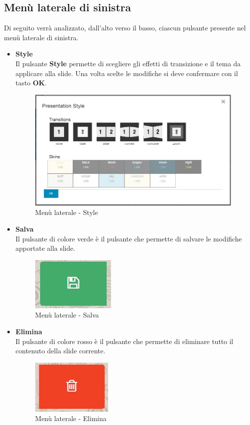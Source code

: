 \subsection{Menù laterale di sinistra}
Di seguito verrà analizzato, dall'alto verso il basso, ciascun pulsante presente nel menù laterale di sinistra.

\begin{itemize}
 \item \textbf{Style}\\
    Il pulsante \textbf{Style} permette di scegliere gli effetti di transizione e il tema da applicare alla slide. Una volta scelte le modifiche si deve confermare con il tasto \textbf{OK}.	
    \begin{figure}[H] 
    	\centering 
    	\includegraphics[scale=0.40] {img/editor_style}
    	\caption{Menù laterale - Style} 
    \end{figure}
	
 \item \textbf{Salva}\\
	Il pulsante di colore verde è il pulsante che permette di salvare le modifiche apportate alla slide. 	
	\begin{figure}[H] 
		\centering 
		\includegraphics[scale=0.40] {img/editor_save}
		\caption{Menù laterale - Salva} 
	\end{figure}
	
	 \item \textbf{Elimina}\\
	 Il pulsante di colore rosso è il pulsante che permette di eliminare tutto il contenuto della slide corrente.  	
	 \begin{figure}[H] 
	 	\centering 
	 	\includegraphics[scale=0.40] {img/editor_del}
	 	\caption{Menù laterale - Elimina} 
	 \end{figure}
	

\end{itemize}
